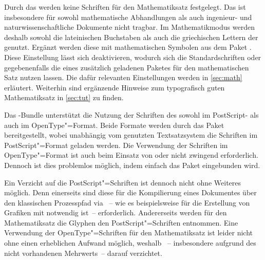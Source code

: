 \begin{Declaration*}{}
\begin{Declaration*}{}
\begin{Declaration*}{}
Durch das \CD werden keine Schriften für den Mathematiksatz festgelegt. Das ist 
insbesondere für sowohl mathematische Abhandlungen als auch ingenieur- und 
naturwissenschaftliche Dokumente nicht tragbar. Im Mathematikmodus werden 
deshalb sowohl die lateinischen Buchstaben als auch die griechischen Lettern 
der \OpenSans genutzt. Ergänzt werden diese mit mathematischen Symbolen aus dem 
Paket . Diese Einstellung lässt sich deaktivieren, wodurch 
sich die Standardschriften oder gegebenenfalls die eines zusätzlich geladenen 
Paketes für den mathematischen Satz nutzen lassen. Die dafür relevanten 
Einstellungen werden in \autoref{sec:math} erläutert. Weiterhin sind ergänzende 
Hinweise zum typografisch guten Mathematiksatz in \autoref{sec:tut} zu finden.


%
%
%
Das \TUDScript-Bundle unterstützt die Nutzung der Schriften des \CDs sowohl 
im PostScript- als auch im OpenType"=Format. Beide Formate werden durch das
Paket  bereitgestellt, wobei unabhängig vom genutzten 
Textsatzsystem die Schriften im PostScript"=Format geladen werden. Die 
Verwendung der Schriften im OpenType"=Format ist auch beim Einsatz von 
 oder  nicht zwingend erforderlich. Dennoch 
ist dies problemlos möglich, indem einfach das Paket  
eingebunden wird.

Ein Verzicht auf die PostScript"=Schriften ist dennoch nicht ohne Weiteres 
möglich. Denn einerseits sind diese für die Kompilierung eines Dokumentes über 
den klassischen Prozesspfad via ~-- wie es 
beispielsweise für die Erstellung von Grafiken mit  notwendig 
ist~-- erforderlich. Andererseits werden für den Mathematiksatz die Glyphen den 
PostScript"=Schriften entnommen. Eine Verwendung der OpenType"=Schriften für 
den Mathematiksatz ist leider nicht ohne einen erheblichen Aufwand möglich, 
weshalb \TUDScript~-- insbesondere aufgrund des nicht vorhandenen Mehrwerts~-- 
darauf verzichtet.
%




\end{Declaration*}
\end{Declaration*}
\end{Declaration*}
